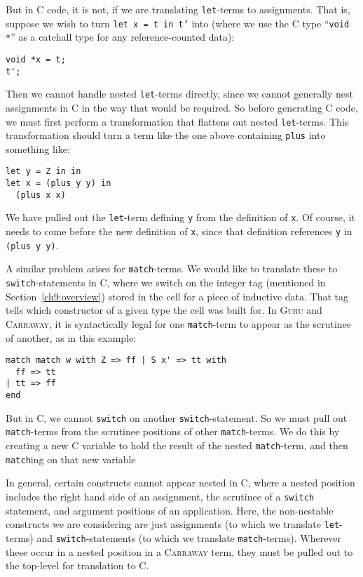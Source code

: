 \documentclass{book}[12pt]
\newcommand{\guru}[0]{\textsc{Guru}\xspace}
\newcommand{\carraway}[0]{\textsc{Carraway}\xspace}
\begin{document}
\noindent But in C code, it is not, if we are translating
\texttt{let}-terms to assignments.  That is, suppose we wish to turn
\texttt{let x = t in t'} into (where we use the C type ``\texttt{void
*}'' as a catchall type for any reference-counted data):

\begin{verbatim}
void *x = t;
t';
\end{verbatim}

\noindent Then we cannot handle nested \texttt{let}-terms directly,
since we cannot generally nest assignments in C in the way that would
be required.  So before generating C code, we must first perform a
transformation that flattens out nested \texttt{let}-terms.  This
transformation should turn a term like the one above containing
\texttt{plus} into something like:

\begin{verbatim}
let y = Z in in
let x = (plus y y) in
  (plus x x)
\end{verbatim}

\noindent We have pulled out the \texttt{let}-term defining \texttt{y}
from the definition of \texttt{x}.  Of course, it needs to come before
the new definition of \texttt{x}, since that definition references
\texttt{y} in \texttt{(plus y y)}.  

A similar problem arises for \texttt{match}-terms.  We would like to
translate these to \texttt{switch}-statements in C, where we switch on
the integer tag (mentioned in Section~\ref{ch9:overview}) stored in
the cell for a piece of inductive data.  That tag tells which
constructor of a given type the cell was built for.  In \guru and
\carraway, it is syntactically legal for one \texttt{match}-term to
appear as the scrutinee of another, as in this example:

\begin{verbatim}
match match w with Z => ff | S x' => tt with
  ff => tt
| tt => ff
end
\end{verbatim}

\noindent But in C, we cannot \texttt{switch} on another
\texttt{switch}-statement.  So we must pull out \texttt{match}-terms
from the scrutinee positions of other \texttt{match}-terms.  We do
this by creating a new C variable to hold the result of the nested
\texttt{match}-term, and then \texttt{match}ing on that new variable

In general, certain constructs cannot appear nested in C, where a
nested position includes the right hand side of an assignment, the
scrutinee of a \texttt{switch} statement, and argument positions of an
application.  Here, the non-nestable constructs we are considering are
just assignments (to which we translate \texttt{let}-terms) and
\texttt{switch}-statements (to which we translate
\texttt{match}-terms).  Wherever these occur in a nested position in a
\carraway term, they must be pulled out to the top-level for
translation to C.
\end{document}
